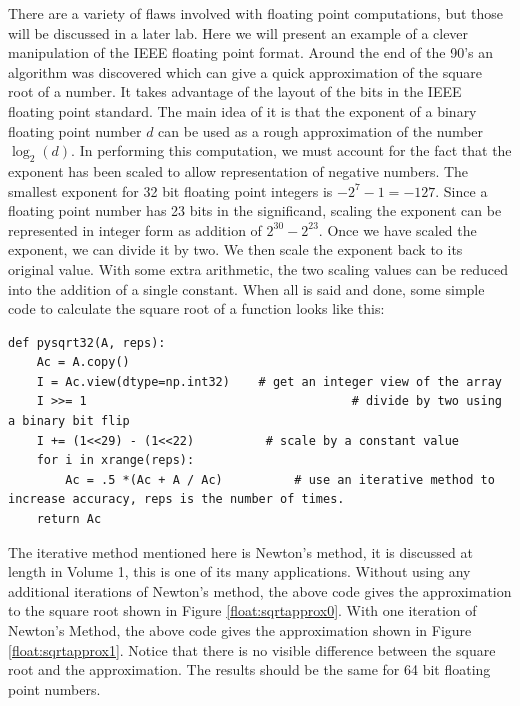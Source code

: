 There are a variety of flaws involved with floating point computations, but those will be discussed in a later lab.
Here we will present an example of a clever manipulation of the IEEE floating point format.
Around the end of the 90's an algorithm was discovered which can give a quick approximation of the square root of a number.
It takes advantage of the layout of the bits in the IEEE floating point standard.
The main idea of it is that the exponent of a binary floating point number $d$ can be used as a rough approximation of the number $\log_2\left(d\right)$.
In performing this computation, we must account for the fact that the exponent has been scaled to allow representation of negative numbers.
The smallest exponent for 32 bit floating point integers is $-2^7 - 1 = -127$.
Since a floating point number has 23 bits in the significand, scaling the exponent can be represented in integer form as addition of $2^{30} - 2^{23}$.
Once we have scaled the exponent, we can divide it by two.
We then scale the exponent back to its original value.
With some extra arithmetic, the two scaling values can be reduced into the addition of a single constant.
When all is said and done, some simple code to calculate the square root of a function looks like this:
\begin{lstlisting}
def pysqrt32(A, reps):
    Ac = A.copy()
    I = Ac.view(dtype=np.int32)    # get an integer view of the array
    I >>= 1                                     # divide by two using a binary bit flip
    I += (1<<29) - (1<<22)          # scale by a constant value
    for i in xrange(reps):
        Ac = .5 *(Ac + A / Ac)          # use an iterative method to increase accuracy, reps is the number of times.
    return Ac
\end{lstlisting}
The iterative method mentioned here is Newton's method, it is discussed at length in Volume 1, this is one of its many applications.
Without using any additional iterations of Newton's method, the above code gives the approximation to the square root shown in Figure \ref{float:sqrtapprox0}.
With one iteration of Newton's Method, the above code gives the approximation shown in Figure \ref{float:sqrtapprox1}.
Notice that there is no visible difference between the square root and the approximation.
The results should be the same for 64 bit floating point numbers.

